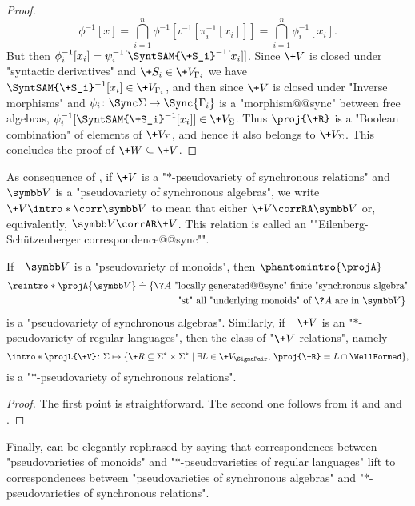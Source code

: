 \begin{proof}
	\[
		\phi^{-1}[x] = \bigcap_{i=1}^n \phi^{-1}[\iota^{-1}[\pi_i^{-1}[x_i]]]
		= \bigcap_{i=1}^n \phi_i^{-1}[x_i].
	\]
	But then $\phi_i^{-1}[x_i] = \psi_i^{-1}[\SyntSAM{\+S_i}^{-1}[x_i]]$.
	Since $\+V$ is closed under "syntactic derivatives" and $\+S_i \in \+V_{\Gamma_i}$
	we have $\SyntSAM{\+S_i}^{-1}[x_i] \in \+V_{\Gamma_i}$, and then since $\+V$ is closed under
	"Inverse morphisms" and $\psi_i\colon \Sync\Sigma \to \Sync{\Gamma_i}$ is a "morphism@@sync" between free algebras,
	$\psi_i^{-1}[\SyntSAM{\+S_i}^{-1}[x_i]] \in \+V_{\Sigma}$.
	Thus $\proj{\+R}$ is a "Boolean combination" of elements of $\+V_{\Sigma}$, and hence
	it also belongs to $\+V_{\Sigma}$. This concludes the proof of $\+W \subseteq \+V$.
\end{proof}

As consequence of , if
$\+V$ is a "$\ast$-pseudovariety of synchronous relations"
and $\B{V}$ is a "pseudovariety of synchronous algebras",
we write \AP$\+V \intro*\corr \B{V}$
to mean that either $\+V \corrRA \B{V}$ or, equivalently, $\B{V} \corrAR \+V$.
This relation is called an \AP""Eilenberg-Schützenberger correspondence@@sync"".

\begin{proposition}
	If~~$\B{V}$ is a "pseudovariety of monoids", then \AP$\phantomintro{\projA}$
	\begin{align*}
		\reintro*\projA{\B{V}} & \defeq
		\{\?A \text{ "locally generated@@sync" finite "synchronous algebra"} \\
		& \qquad\qquad \text{ "st" all "underlying monoids" of $\?A$ are in $\B{V}$}\}
	\end{align*}
	is a "pseudovariety of synchronous algebras". Similarly,
	if~~$\+V$ is an "$\ast$-pseudovariety of regular languages", then
	the class of "$\+V$-relations", namely
	\[
		\intro*\projL{\+V} \colon
		\Sigma \mapsto \{\+R \subseteq \Sigma^* \times \Sigma^* \mid \exists L \in \+V_{\SigmaPair},\, \proj{\+R} = L \cap \WellFormed \},
	\]
	is a "$\ast$-pseudovariety of synchronous relations".
\end{proposition}

\begin{proof}
	The first point is straightforward. The second one follows from it and and .
\end{proof}

\AP{}
Finally,  can be elegantly rephrased
by saying that correspondences between "pseudovarieties of monoids"
and "$\ast$-pseudovarieties of regular languages" lift to correspondences
between "pseudovarieties of synchronous algebras" and
"$\ast$-pseudovarieties of synchronous relations".


